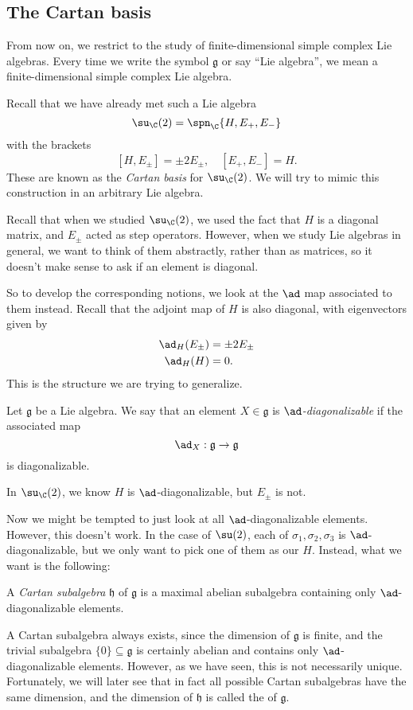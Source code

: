 \documentclass[a4paper]{article}
\begin{document}
\subsection{The Cartan basis}
From now on, we restrict to the study of finite-dimensional simple complex Lie algebras. Every time we write the symbol $\mathfrak{g}$ or say ``Lie algebra'', we mean a finite-dimensional simple complex Lie algebra.

Recall that we have already met such a Lie algebra
\[
  \su_\C(2) = \spn_\C \{H, E_+, E_-\}
\]
with the brackets
\[
  [H, E_{\pm}] = \pm 2E_{\pm},\quad [E_+, E_-] = H.
\]
These are known as the \emph{Cartan basis} for $\su_\C(2)$. We will try to mimic this construction in an arbitrary Lie algebra.

Recall that when we studied $\su_\C(2)$, we used the fact that $H$ is a diagonal matrix, and $E_{\pm}$ acted as step operators. However, when we study Lie algebras in general, we want to think of them abstractly, rather than as matrices, so it doesn't make sense to ask if an element is diagonal.

So to develop the corresponding notions, we look at the $\ad$ map associated to them instead. Recall that the adjoint map of $H$ is also diagonal, with eigenvectors given by
\begin{align*}
  \ad_H(E_{\pm}) &= \pm 2 E_{\pm}\\
  \ad_H(H) &= 0.
\end{align*}
This is the structure we are trying to generalize.

\begin{defi}[$\ad$-diagonalizable]
  Let $\mathfrak{g}$ be a Lie algebra. We say that an element $X \in \mathfrak{g}$ is \emph{$\ad$-diagonalizable} if the associated map
  \[
    \ad_X: \mathfrak{g} \to \mathfrak{g}
  \]
  is diagonalizable.
\end{defi}

\begin{eg}
  In $\su_\C(2)$, we know $H$ is $\ad$-diagonalizable, but $E_{\pm}$ is not.
\end{eg}

Now we might be tempted to just look at all $\ad$-diagonalizable elements. However, this doesn't work. In the case of $\su(2)$, each of $\sigma_1, \sigma_2, \sigma_3$ is $\ad$-diagonalizable, but we only want to pick one of them as our $H$. Instead, what we want is the following:

\begin{defi}
  A \emph{Cartan subalgebra} $\mathfrak{h}$ of $\mathfrak{g}$ is a maximal abelian subalgebra containing only $\ad$-diagonalizable elements.
\end{defi}
A Cartan subalgebra always exists, since the dimension of $\mathfrak{g}$ is finite, and the trivial subalgebra $\{0\} \subseteq \mathfrak{g}$ is certainly abelian and contains only $\ad$-diagonalizable elements. However, as we have seen, this is not necessarily unique. Fortunately, we will later see that in fact all possible Cartan subalgebras have the same dimension, and the dimension of $\mathfrak{h}$ is called the  of $\mathfrak{g}$. %
\end{document}
